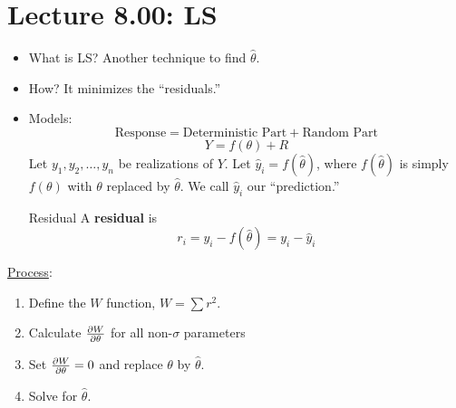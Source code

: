 \section{Lecture 8.00: LS}
\begin{itemize}
    \item What is LS\@? Another technique to find $ \hat{\theta} $.
    \item How? It minimizes the ``residuals.''
    \item Models:
          \[ \text{Response}=\text{Deterministic Part}+\text{Random Part} \]
          \[ Y=f(\theta)+R \]
          Let $ y_1,y_2,\ldots,y_n $ be realizations of $ Y $. Let
          $ \hat{y}_i=f(\hat{\theta}) $, where $ f(\hat{\theta}) $
          is simply $ f(\theta) $ with $ \theta $ replaced
          by $ \hat{\theta} $. We call $ \hat{y}_i $ our ``prediction.''
          \begin{Definition}{Residual}{}
              A \textbf{residual} is
              \[ r_i=y_i-f(\hat{\theta})=y_i-\hat{y}_i \]
          \end{Definition}
\end{itemize}
\underline{Process}:
\begin{enumerate}[(1)]
    \item Define the $ W $ function, $ W=\sum r^2 $.
    \item Calculate $ \pdv{W}{\theta} $ for all non-$ \sigma $
          parameters
    \item Set $ \pdv{W}{\theta}=0 $ and replace $ \theta $ by $ \hat{\theta} $.
    \item Solve for $ \hat{\theta} $.
\end{enumerate}

